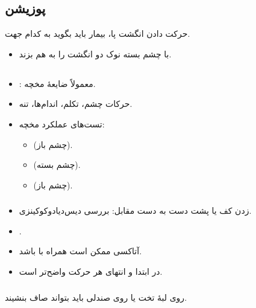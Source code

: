 \documentclass[a4paper,12pt]{extbook}
\begin{document}
\subsection*{ پوزیشن}
حرکت دادن انگشت پا، بیمار باید بگوید به کدام جهت.
\begin{itemize}
\item با چشم بسته نوک دو انگشت را به هم بزند.
\end{itemize}
\subsection*{}
\begin{itemize}
\item {}: معمولاً ضایعهٔ مخچه.
\item حرکات چشم، تکلم، اندام‌ها، تنه.
\item تست‌های عملکرد مخچه:
  \begin{itemize}
  \item {} (چشم باز).
  \item {} (چشم بسته).
  \item {} (چشم باز).
  \end{itemize}
\end{itemize}
\subsubsection*{}
\begin{itemize}
\item زدن کف یا پشت دست به دست مقابل: بررسی دیس‌دیادوکوکینزی.
\item {}.
\item آتاکسی ممکن است همراه با  باشد.
\item در ابتدا و انتهای هر حرکت واضح‌تر است.
\end{itemize}
\subsubsection*{}
روی لبهٔ تخت یا روی صندلی باید بتواند صاف بنشیند.
\subsection*{}
\end{document}
